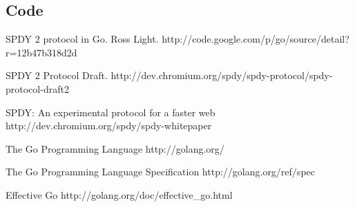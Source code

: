 \documentclass{article}
\begin{document}
\subsection{Code}
 \begin{thebibliography}{99}
  SPDY 2 protocol in Go. Ross Light. 
 http://code.google.com/p/go/source/detail?r=12b47b318d2d

  SPDY 2 Protocol Draft.
 http://dev.chromium.org/spdy/spdy-protocol/spdy-protocol-draft2

  SPDY: An experimental protocol for a faster web
 http://dev.chromium.org/spdy/spdy-whitepaper

  The Go Programming Language
 http://golang.org/

  The Go Programming Language Specification
 http://golang.org/ref/spec

  Effective Go
 http://golang.org/doc/effective\_go.html
  \end{thebibliography}

\end{document}
